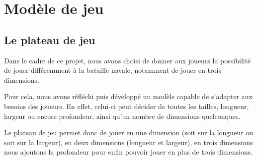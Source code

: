 \section{Modèle de jeu}


\subsection{Le plateau de jeu}

	Dans le cadre de ce projet, nous avons choisi de donner aux joueurs la possibilité de jouer différemment à la bataille navale, notamment de jouer en trois dimensions.\newline
	
	Pour cela, nous avons réfléchi puis développé un modèle capable de s'adapter aux besoins des joueurs. En effet, celui-ci peut décider de toutes les tailles, longueur, largeur ou encore profondeur, ainsi qu'un nombre de dimensions quelconques. \newline
	
	Le plateau de jeu permet donc de jouer en une dimension (soit sur la longueur ou soit sur la largeur), en deux dimensions (longueur et largeur), en trois dimensions nous ajoutons la profondeur pour enfin pouvoir jouer en plus de trois dimensions.


